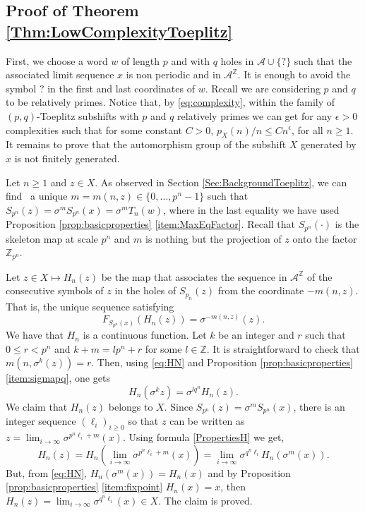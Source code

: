 \documentclass{daj}
\theoremstyle{plain}
\theoremstyle{definition}
\begin{document}
\subsection{Proof of Theorem \ref{Thm:LowComplexityToeplitz}}

First, we choose a word $w$ of length $p$ and with $q$ holes in $\mathcal{A}\cup\{ ?\}$ such that the associated limit sequence $x$ is  non periodic and in $\mathcal{A}^\mathbb{Z}$. It is enough to avoid the symbol $?$ in the first and last coordinates of $w$. Recall we are considering $p$ and $q$ to be relatively primes. 
Notice that, by \eqref{eq:complexity}, within the family of $(p,q)$-Toeplitz subshifts with $p$ and $q$ relatively primes we can get for any $\epsilon >0$ complexities such that for some constant $C>0$, ${p_X(n)}/{n}\leq C n^{\epsilon}$, for all $n \geq 1$. It remains to prove that the automorphism group of the subshift $X$ generated by $x$ is not finitely generated. 

Let $n \geq 1$ and $z \in X$. As observed in Section \ref{Sec:BackgroundToeplitz}, we can find  \ a unique $m=m(n,z)\in \{0,\ldots,p^n-1\}$ such that $S_{p^n}(z)=\sigma^{m}S_{p^n}(x)=\sigma^{m}T_n(w)$, where in the last equality we have used Proposition \ref{prop:basicproperties} \eqref{item:MaxEqFactor}. Recall that $S_{p^n}(\cdot)$ is the skeleton map at scale $p^n$ and $m$ is nothing but the projection of $z$ onto the factor $\mathbb{Z}_{p^n}$. 

Let $z \in X \mapsto H_n(z)$ be the map that associates  the sequence in ${\mathcal A}^{\mathbb{Z}}$ of the consecutive symbols of $z$ 
in the holes of $S_{p_n}(z)$ from the coordinate $-m(n,z)$. 
That is, the unique sequence satisfying 
\begin{equation}
\label{eq:HN}
F_{S_{p^n} (x)} (H_n (z)) = \sigma^{-m(n,z)} (z) .
\end{equation}
We have that $H_n$ is a continuous function.
Let $k$ be an integer and $r$ such that $0\leq r < p^n$  and $k+m=lp^n + r$ for some  $l\in \mathbb{Z}$. 
It is straightforward to check that $m(n,\sigma^k (z))=r$. 
Then, using \eqref{eq:HN} and Proposition \ref{prop:basicproperties} \eqref{item:sigmapq}, one gets
\begin{equation} \label{PropertiesH}
H_n(\sigma^{k} z)= \sigma^{lq^n}H_{n}(z) .                                             
\end{equation}
We claim that $H_n(z)$ belongs to  $X$.
Since $S_{p^n}(z) = \sigma^mS_{p^n}(x)$, there is an integer sequence $(\ell_{i})_{i\ge 0}$ so that  $z$ can be written as $z=\lim_{i\to \infty} \sigma^{p^n \ell_i+m}(x)$.
Using formula \eqref{PropertiesH} we get, 
$$H_n(z)=H_n(\lim_{i\to \infty} \sigma^{p^n \ell_i+m}(x))=\lim_{i\to \infty}
\sigma^{q^n \ell_i} H_n(\sigma^{m}(x)).$$
But, from \eqref{eq:HN}, $H_n(\sigma^{m}(x))=H_n(x)$ and 
by Proposition \ref{prop:basicproperties} \eqref{item:fixpoint} $H_n(x)=x$, then 
$H_n(z)=\lim_{i\to \infty} \sigma^{q^n \ell_i}(x) \in X$. The claim is proved. 
\end{document}
